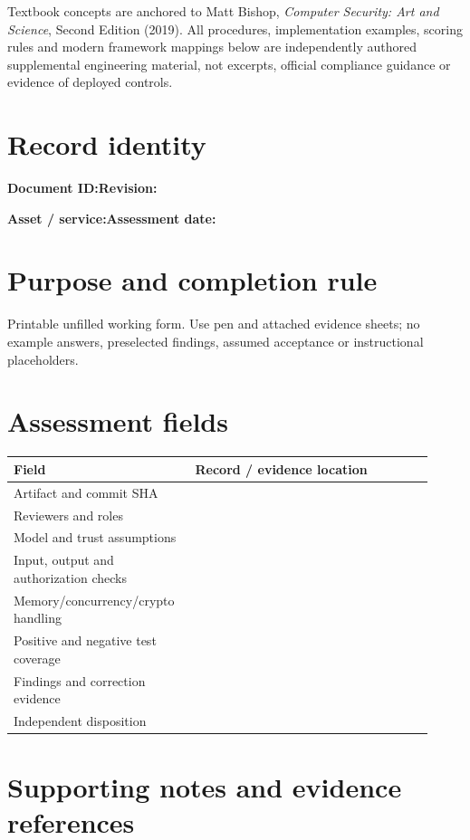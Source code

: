 \documentclass[10pt,letterpaper]{article}
\begin{document}
\makedoctocpage
\begin{notebox}
Textbook concepts are anchored to Matt Bishop, \emph{Computer Security: Art and Science}, Second Edition (2019). All procedures, implementation examples, scoring rules and modern framework mappings below are independently authored supplemental engineering material, not excerpts, official compliance guidance or evidence of deployed controls.
\end{notebox}
\section{Record identity}
\textbf{Document ID:}\enspace\hrulefill\quad\textbf{Revision:}\enspace\hrulefill
\par\medskip\textbf{Asset / service:}\enspace\hrulefill\quad\textbf{Assessment date:}\enspace\hrulefill
\section{Purpose and completion rule}
Printable unfilled working form. Use pen and attached evidence sheets; no example answers, preselected findings, assumed acceptance or instructional placeholders.
\section{Assessment fields}
\renewcommand{\arraystretch}{1.8}
\begin{longtable}{@{}p{0.38\linewidth}p{0.54\linewidth}@{}}
\toprule\textbf{Field}&\textbf{Record / evidence location}\\\midrule\endhead
Artifact and commit SHA & \rule{0pt}{1.3cm}\\\midrule
Reviewers and roles & \rule{0pt}{1.3cm}\\\midrule
Model and trust assumptions & \rule{0pt}{1.3cm}\\\midrule
Input, output and authorization checks & \rule{0pt}{1.3cm}\\\midrule
Memory/concurrency/crypto handling & \rule{0pt}{1.3cm}\\\midrule
Positive and negative test coverage & \rule{0pt}{1.3cm}\\\midrule
Findings and correction evidence & \rule{0pt}{1.3cm}\\\midrule
Independent disposition & \rule{0pt}{1.3cm}\\\midrule
\bottomrule\end{longtable}
\section{Supporting notes and evidence references}
\end{document}
